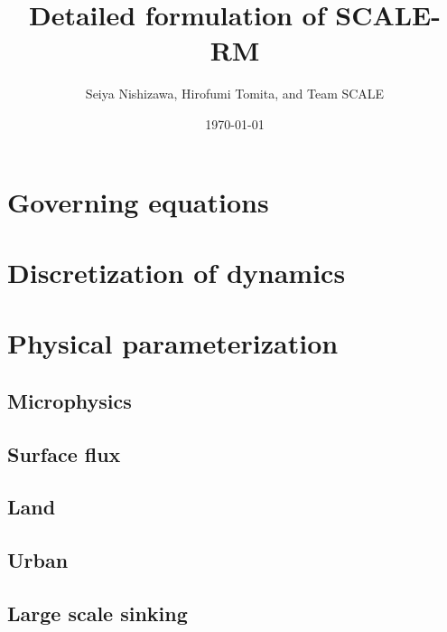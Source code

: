 \documentclass[a4paper]{report}
\title{{\LARGE Detailed formulation of SCALE-RM}}
\author{Seiya Nishizawa, Hirofumi Tomita, and Team SCALE}
\date{\today}
\begin{document}
\maketitle
\tableofcontents



\chapter{Governing equations}


\chapter{Discretization of dynamics}
\label{chap:discretization dynamics}














\chapter{Physical parameterization}



\section{Microphysics}


%



\section{Surface flux}


\section{Land} \label{sec:land}


\section{Urban}


%

\section{Large scale sinking}





\appendix





\end{document}
